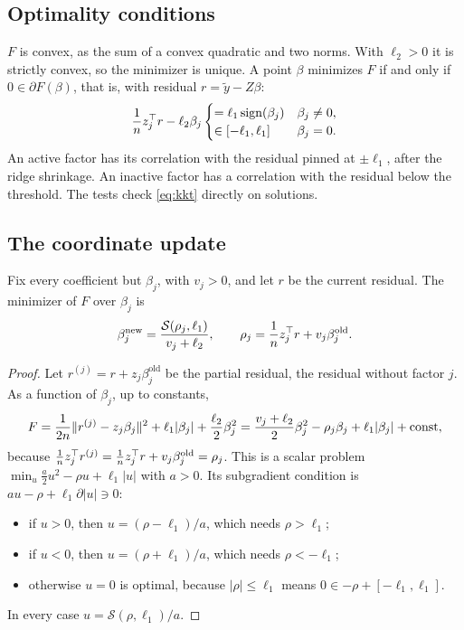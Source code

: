 \documentclass[11pt,a4paper]{article}
\newcommand{\sth}{\mathcal{S}}
\begin{document}
\subsection{Optimality conditions}

$F$ is convex, as the sum of a convex quadratic and two norms. With $\ell_2>0$ it is
strictly convex, so the minimizer is unique. A point $\beta$ minimizes $F$ if and only if
$0\in\partial F(\beta)$, that is, with residual $r=\tilde y-Z\beta$:
\begin{equation}\label{eq:kkt}
  \frac1n z_j^\top r-\ell_2\beta_j
  \begin{cases}
    =\ell_1\operatorname{sign}(\beta_j) & \beta_j\ne0,\\
    \in[-\ell_1,\ell_1] & \beta_j=0.
  \end{cases}
\end{equation}
An active factor has its correlation with the residual pinned at $\pm\ell_1$, after the
ridge shrinkage. An inactive factor has a correlation with the residual below the
threshold. The tests check \eqref{eq:kkt} directly on solutions.

\subsection{The coordinate update}

\begin{proposition}\label{prop:cd}
Fix every coefficient but $\beta_j$, with $v_j>0$, and let $r$ be the current residual. The
minimizer of $F$ over $\beta_j$ is
\[
  \beta_j^{\text{new}}=\frac{\sth(\rho_j,\ell_1)}{v_j+\ell_2},\qquad
  \rho_j=\frac1n z_j^\T r+v_j\beta_j^{\text{old}}.
\]
\end{proposition}
\begin{proof}
Let $r^{(j)}=r+z_j\beta_j^{\text{old}}$ be the partial residual, the residual without factor
$j$. As a function of $\beta_j$, up to constants,
\[
  F=\frac1{2n}\lVert r^{(j)}-z_j\beta_j\rVert^2+\ell_1|\beta_j|+\frac{\ell_2}2\beta_j^2
   =\frac{v_j+\ell_2}{2}\beta_j^2-\rho_j\beta_j+\ell_1|\beta_j|+\text{const},
\]
because $\frac1nz_j^\top r^{(j)}=\frac1nz_j^\top r+v_j\beta_j^{\text{old}}=\rho_j$. This is a scalar problem
$\min_u\frac a2u^2-\rho u+\ell_1|u|$ with $a>0$. Its subgradient condition is
$au-\rho+\ell_1\partial|u|\ni0$:
\begin{itemize}
  \item if $u>0$, then $u=(\rho-\ell_1)/a$, which needs $\rho>\ell_1$;
  \item if $u<0$, then $u=(\rho+\ell_1)/a$, which needs $\rho<-\ell_1$;
  \item otherwise $u=0$ is optimal, because $|\rho|\le\ell_1$ means $0\in-\rho+[-\ell_1,\ell_1]$.
\end{itemize}
In every case $u=\sth(\rho,\ell_1)/a$.
\end{proof}
\end{document}
